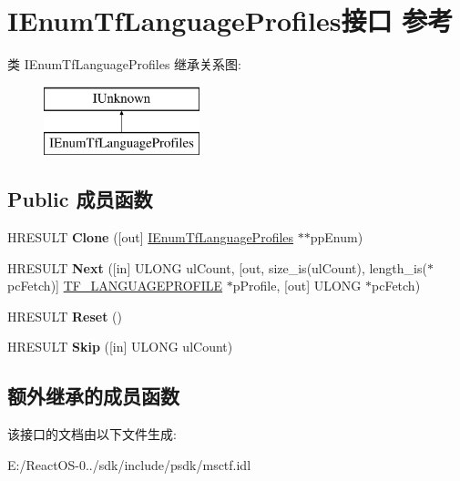 \hypertarget{interface_i_enum_tf_language_profiles}{}\section{I\+Enum\+Tf\+Language\+Profiles接口 参考}
\label{interface_i_enum_tf_language_profiles}
类 I\+Enum\+Tf\+Language\+Profiles 继承关系图\+:\begin{figure}[H]
\begin{center}
\leavevmode
\includegraphics[height=2.000000cm]{interface_i_enum_tf_language_profiles}
\end{center}
\end{figure}
\subsection*{Public 成员函数}
\begin{DoxyCompactItemize}
\item 
\mbox{\label{interface_i_enum_tf_language_profiles_a4612e9e5e370a04ad92b479aabd28307}} 
H\+R\+E\+S\+U\+LT {\bfseries Clone} (\mbox{[}out\mbox{]} \hyperlink{interface_i_enum_tf_language_profiles}{I\+Enum\+Tf\+Language\+Profiles} $\ast$$\ast$pp\+Enum)
\item 
\mbox{\label{interface_i_enum_tf_language_profiles_a07d4fb7bc59ee6c66dcccb8dd156684b}} 
H\+R\+E\+S\+U\+LT {\bfseries Next} (\mbox{[}in\mbox{]} U\+L\+O\+NG ul\+Count, \mbox{[}out, size\+\_\+is(ul\+Count), length\+\_\+is($\ast$pc\+Fetch)\mbox{]} \hyperlink{struct_t_f___l_a_n_g_u_a_g_e_p_r_o_f_i_l_e}{T\+F\+\_\+\+L\+A\+N\+G\+U\+A\+G\+E\+P\+R\+O\+F\+I\+LE} $\ast$p\+Profile, \mbox{[}out\mbox{]} U\+L\+O\+NG $\ast$pc\+Fetch)
\item 
\mbox{\label{interface_i_enum_tf_language_profiles_a8d7d49e8ac5c4e002f55f619de1466d3}} 
H\+R\+E\+S\+U\+LT {\bfseries Reset} ()
\item 
\mbox{\label{interface_i_enum_tf_language_profiles_a9f51b646828b28efa9eafd277880b754}} 
H\+R\+E\+S\+U\+LT {\bfseries Skip} (\mbox{[}in\mbox{]} U\+L\+O\+NG ul\+Count)
\end{DoxyCompactItemize}
\subsection*{额外继承的成员函数}


该接口的文档由以下文件生成\+:\begin{DoxyCompactItemize}
\item 
E\+:/\+React\+O\+S-\/0../sdk/include/psdk/msctf.\+idl\end{DoxyCompactItemize}
